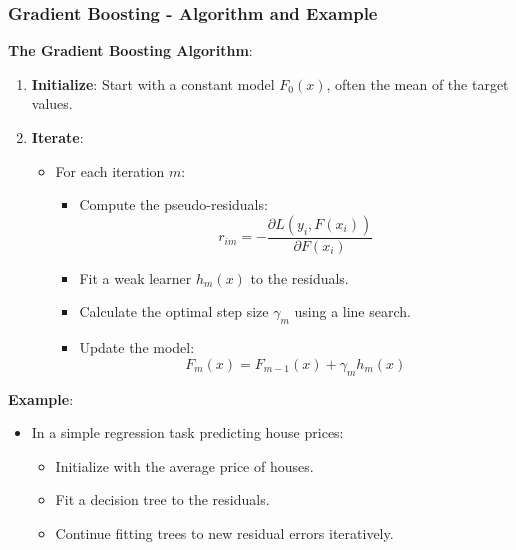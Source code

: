 \documentclass[aspectratio=169]{beamer}
\begin{document}
\begin{frame}[fragile]
    \frametitle{Gradient Boosting - Algorithm and Example}
    \textbf{The Gradient Boosting Algorithm}:
    \begin{enumerate}
        \item \textbf{Initialize}: Start with a constant model $F_0(x)$, often the mean of the target values.
        \item \textbf{Iterate}:
        \begin{itemize}
            \item For each iteration $m$:
            \begin{itemize}
                \item Compute the pseudo-residuals:
                \begin{equation}
                    r_{im} = -\frac{\partial L(y_i, F(x_i))}{\partial F(x_i)}
                \end{equation}
                \item Fit a weak learner $h_m(x)$ to the residuals.
                \item Calculate the optimal step size $\gamma_m$ using a line search.
                \item Update the model:
                \begin{equation}
                    F_{m}(x) = F_{m-1}(x) + \gamma_m h_m(x)
                \end{equation}
            \end{itemize}
        \end{itemize}
    \end{enumerate}

    \textbf{Example}:
    \begin{itemize}
        \item In a simple regression task predicting house prices:
        \begin{itemize}
            \item Initialize with the average price of houses.
            \item Fit a decision tree to the residuals.
            \item Continue fitting trees to new residual errors iteratively.
        \end{itemize}
    \end{itemize}
\end{frame}
\end{document}
